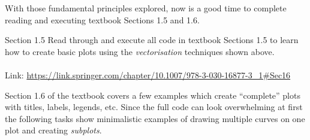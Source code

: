 \documentclass{lab}
\begin{document}
With those fundamental principles explored, now is a good time to complete reading and executing textbook Sections 1.5 and 1.6.

\begin{task}{Section 1.5}{}
Read through and execute all code in textbook Sections 1.5 to learn how to create basic plots using the \textit{vectorisation} techniques shown above.
\\~\\
Link: \url{https://link.springer.com/chapter/10.1007/978-3-030-16877-3_1#Sec16}
\end{task}

\pagebreak 
Section 1.6 of the textbook covers a few examples which create ``complete'' plots with titles, labels, legends, etc. Since the full code can look overwhelming at first the following tasks show minimalistic examples of drawing multiple curves on one plot and creating \textit{subplots}.
\end{document}
